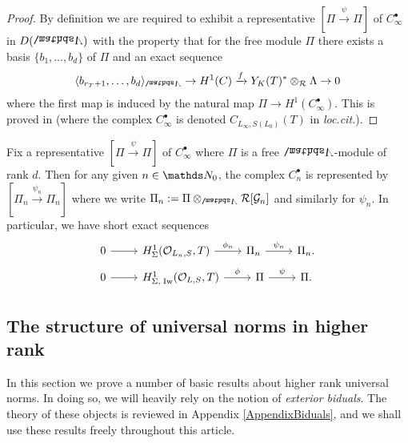 \documentclass[a4paper, 
headsepline=off, DIV=12, titlepage=false]{scrartcl}
\begin{document}
\begin{proof}
    By definition we are required to exhibit a representative $[\Pi \xrightarrow{\psi} \Pi]$ of $C_\infty^\bullet$ in $D(\bLambda)$ with the property that for the free module $\Pi$ there exists a basis $\{b_1,\dots, b_d\}$ of $\Pi$ and an exact sequence
    \begin{align*}
        \langle b_{r_T+1}, \dots, b_d\rangle_{\bLambda} \to H^1(C) \xrightarrow{f} Y_K(T)^* \otimes_\cR \Lambda \to 0
    \end{align*}
    where the first map is induced by the natural map $\Pi \to H^1(C_\infty^\bullet)$. This is proved in
    \cite[Lem.\@ 7.10]{BuSaNC} (where the complex $C_\infty^\bullet$ is denoted $C_{L_\infty, S(L_0)}(T)$ in \textit{loc.\@ cit.\@}).
\end{proof}


Fix a representative $[\Pi \xrightarrow{\psi} \Pi]$ of $C_\infty^\bullet$ where $\Pi$ is a free $\bLambda$-module of rank $d$. Then for any given $n \in \NN_0$, the complex $C_n^\bullet$ is represented by $[\Pi_n \xrightarrow{\psi_n} \Pi_n]$ where we write $\Pi_n := \Pi \otimes_{\bLambda} \cR[\cG_n]$ and similarly for $\psi_n$. In particular, we have short exact sequences
\begin{align}\label{yoneda-extension-sequence}
& \begin{tikzcd}[ampersand replacement=\&]
0 \arrow{r} \& H^1_\Sigma(\cO_{L_n, S}, T) \arrow{r}{\phi_n} \& \Pi_n \arrow{r}{\psi_n}  \& \Pi_n.
\end{tikzcd} \\
\label{yoneda-extension-sequence-Iwasawa}
& \begin{tikzcd}[ampersand replacement=\&]
0 \arrow{r} \& H^1_{\Sigma, \; \Iw}(\cO_{L, S}, T) \arrow{r}{\phi} \& \Pi \arrow{r}{\psi}  \& \Pi.
\end{tikzcd}
\end{align}




\subsection{The structure of universal norms in higher rank}


In this section we prove a number of basic results about higher rank universal norms. In doing so, we will heavily rely on the notion of \textit{exterior biduals}. The theory of these objects is reviewed in Appendix \ref{AppendixBiduals}, and we shall use these results freely throughout this article. 
\end{document}
